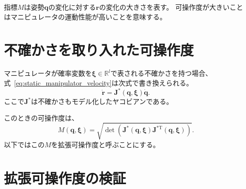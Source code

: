 \documentclass[10pt,a4j,twocolumn]{ltjsarticle}
\begin{document}
指標$M$は姿勢$\bm{q}$の変化に対する$\bm{r}$の変化の大きさを表す。
可操作度が大きいことはマニピュレータの運動性能が高いことを意味する。

\section{不確かさを取り入れた可操作度}

マニピュレータが確率変数を$\bm{\xi} \in \mathbb{R}^{l}$で表される不確かさを持つ場合、式~\eqref{eq:static_manipulator_velocity}は次式で書き換えられる。
\begin{equation}
  \dot{\bm{r}} = \bm{J}^{*}(\bm{q}, \bm{\xi}) \dot{\bm{q}}. \label{eq:static_manipulator_velocity_with_uncertainty}
\end{equation}
ここで$\bm{J}^{*}$は不確かさもモデル化したヤコビアンである。

このときの可操作度は、
\begin{equation}
  M(\bm{q}, \bm{\xi}) = \sqrt{\det \left( \bm{J}^{*}(\bm{q}, \bm{\xi}) \bm{J}^{*\mathrm{T}}(\bm{q}, \bm{\xi}) \right)}.
\end{equation}
以下ではこの$M$を拡張可操作度と呼ぶことにする。

\section{拡張可操作度の検証}
\end{document}
